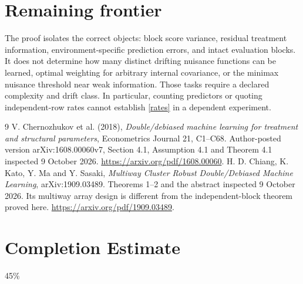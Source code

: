 \documentclass[11pt]{article}
\theoremstyle{remark}
\begin{document}
\section{Remaining frontier}
The proof isolates the correct objects: block score variance, residual treatment information, environment-specific prediction errors, and intact evaluation blocks. It does not determine how many distinct drifting nuisance functions can be learned, optimal weighting for arbitrary internal covariance, or the minimax nuisance threshold near weak information. Those tasks require a declared complexity and drift class. In particular, counting predictors or quoting independent-row rates cannot establish \eqref{rates} in a dependent experiment.

\begin{thebibliography}{9}
 V. Chernozhukov et al. (2018), \emph{Double/debiased machine learning for treatment and structural parameters}, Econometrics Journal 21, C1--C68. Author-posted version arXiv:1608.00060v7, Section 4.1, Assumption 4.1 and Theorem 4.1 inspected 9 October 2026. \url{https://arxiv.org/pdf/1608.00060}.
 H. D. Chiang, K. Kato, Y. Ma and Y. Sasaki, \emph{Multiway Cluster Robust Double/Debiased Machine Learning}, arXiv:1909.03489. Theorems 1--2 and the abstract inspected 9 October 2026. Its multiway array design is different from the independent-block theorem proved here. \url{https://arxiv.org/pdf/1909.03489}.
\end{thebibliography}

\section{Completion Estimate}
45\%
\end{document}
